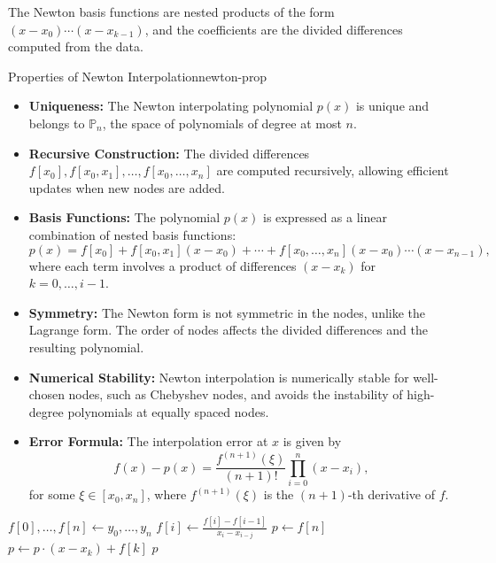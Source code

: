The Newton basis functions are nested products of the form \((x-x_0)\cdots(x-x_{k-1})\), and the coefficients are the divided differences computed from the data.

\begin{property}{Properties of Newton Interpolation}{newton-prop}
    \begin{itemize}[nosep]
        \item \textbf{Uniqueness:} The Newton interpolating polynomial \(p(x)\) is unique and belongs to \(\mathbb{P}_n\), the space of polynomials of degree at most \(n\).
        \item \textbf{Recursive Construction:} The divided differences \(f[x_0], f[x_0, x_1], \ldots, f[x_0, \ldots, x_n]\) are computed recursively, allowing efficient updates when new nodes are added.
        \item \textbf{Basis Functions:} The polynomial \(p(x)\) is expressed as a linear combination of nested basis functions:
              \[
                  p(x) = f[x_0] + f[x_0, x_1](x-x_0) + \cdots + f[x_0, \ldots, x_n](x-x_0)\cdots(x-x_{n-1}),
              \]
              where each term involves a product of differences \((x-x_k)\) for \(k=0,\ldots,i-1\).
        \item \textbf{Symmetry:} The Newton form is not symmetric in the nodes, unlike the Lagrange form. The order of nodes affects the divided differences and the resulting polynomial.
        \item \textbf{Numerical Stability:} Newton interpolation is numerically stable for well-chosen nodes, such as Chebyshev nodes, and avoids the instability of high-degree polynomials at equally spaced nodes.
        \item \textbf{Error Formula:} The interpolation error at \(x\) is given by
              \[
                  f(x) - p(x) = \frac{f^{(n+1)}(\xi)}{(n+1)!} \prod_{i=0}^n (x - x_i),
              \]
              for some \(\xi \in [x_0, x_n]\), where \(f^{(n+1)}(\xi)\) is the \((n+1)\)-th derivative of \(f\).
    \end{itemize}
\end{property}

\begin{algorithm}[H]
    \caption{Newton Interpolation (Divided Differences)}
    \begin{algorithmic}[1]
        \State \(f[0],\ldots,f[n] \gets y_0,\ldots,y_n\) 
        \State \(f[i] \gets \frac{f[i] - f[i-1]}{x_i - x_{i-j}}\)
        \EndFor
        \EndFor
        \State \(p \gets f[n]\)
        \State \(p \gets p \cdot (x - x_k) + f[k]\)
        \EndFor
        \State \Return \(p\)
    \end{algorithmic}
\end{algorithm}

